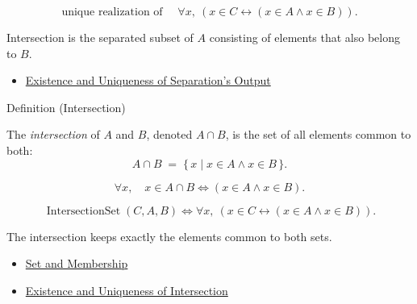 \begin{remark*}
\[
  \text{unique realization of }\quad
  \forall x,\ (x\in C\leftrightarrow(x\in A\wedge x\in B)).
\]
\end{remark*}

\begin{remark*}[Interpretation]
Intersection is the separated subset of \(A\) consisting of elements that also
belong to \(B\).
\end{remark*}

\begin{dependencies}
\begin{itemize}
  \item \hyperref[thm:separation-output-exists-unique]{Existence and Uniqueness of Separation's Output}
\end{itemize}
\end{dependencies}

\begin{definitionbox}{Definition (Intersection)}
\begin{definition}[Intersection]\label{def:intersection}
The \emph{intersection} of $A$ and $B$, denoted $A \cap B$, is the set of all
elements common to both:
\[
A \cap B \;=\; \{\, x \mid x \in A \land x \in B \,\}.
\]
\end{definition}
\end{definitionbox}

\begin{remark*}
\[
  \forall x,\quad x\in A\cap B \iff (x\in A\wedge x\in B).
\]
\end{remark*}

\begin{remark*}
\[
  \operatorname{IntersectionSet}(C,A,B)
  \iff
  \forall x,\ (x\in C \leftrightarrow (x\in A\wedge x\in B)).
\]
\end{remark*}

\begin{remark*}[Interpretation]
The intersection keeps exactly the elements common to both sets.
\end{remark*}

\begin{dependencies}
\begin{itemize}
  \item \hyperref[def:set-membership]{Set and Membership}
  \item \hyperref[cor:intersection-exists-unique]{Existence and Uniqueness of Intersection}
\end{itemize}
\end{dependencies}

